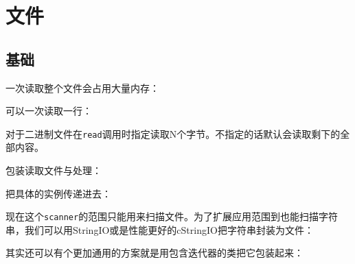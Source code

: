 
\chapter{文件}

	\section{基础}
		
		一次读取整个文件会占用大量内存：

		

		可以一次读取一行：

		

		对于二进制文件在\verb|read|调用时指定读取N个字节。不指定的话默认会读取剩下的全部内容。

		包装读取文件与处理：

		

		把具体的实例传递进去：

		

		现在这个\verb|scanner|的范围只能用来扫描文件。为了扩展应用范围到也能扫描字符串，我们可以用StringIO或是性能更好的cStringIO把字符串封装为文件：

		

		其实还可以有个更加通用的方案就是用包含迭代器的类把它包装起来：

		

